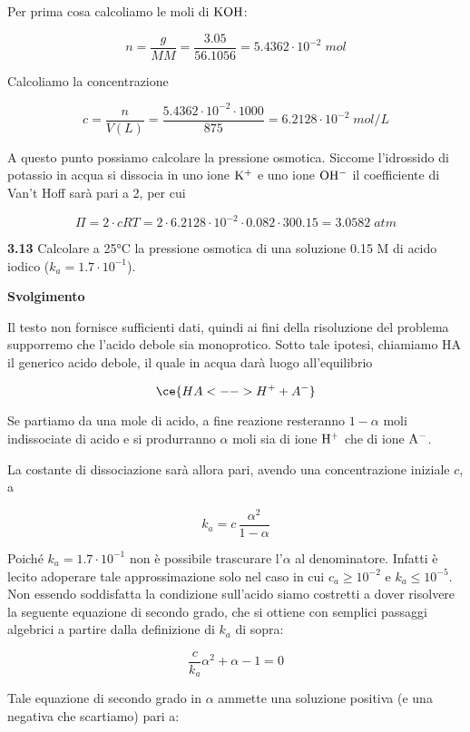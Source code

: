 \vspace{0.2cm}Per prima cosa calcoliamo le moli di $\rm KOH$:

$$n=\frac{g}{MM}=\frac{3.05}{56.1056}=5.4362 \cdot 10^{-2}\;mol$$

Calcoliamo la concentrazione

$$c=\frac{n}{V(L)}=\frac{5.4362 \cdot 10^{-2} \cdot 1000}{875}=6.2128 \cdot 10^{-2}\;mol/L$$

A questo punto possiamo calcolare la pressione osmotica. Siccome l'idrossido di potassio in acqua si dissocia in uno ione $\rm K^{+}$ e uno ione $\rm OH^-$ il coefficiente di Van't Hoff sarà pari a 2, per cui

$$\Pi=2 \cdot cRT
=2 \cdot 6.2128 \cdot 10^{-2} \cdot 0.082 \cdot 300.15
=3.0582\;atm$$

\vspace{0.2cm}\textbf{3.13} Calcolare a 25°C la pressione osmotica di una soluzione 0.15 M di acido iodico ($k_a=1.7 \cdot 10^{-1}$).

\vspace{0.2cm}\large\textbf{Svolgimento}\normalsize

\vspace{0.2cm}Il testo non fornisce sufficienti dati, quindi ai fini della risoluzione del problema supporremo che l'acido debole sia monoprotico. Sotto tale ipotesi, chiamiamo HA il generico acido debole, il quale in acqua darà luogo all'equilibrio

$$\ce{HA <--> H^+ + A^-}$$

Se partiamo da una mole di acido, a fine reazione resteranno $1 - \alpha$ moli indissociate di acido e si produrranno $\alpha$ moli sia di ione $\rm H^+$ che di ione $\rm A^-$. 

La costante di dissociazione sarà allora pari, avendo una concentrazione iniziale $c$, a

$$k_a=c\,\frac{\alpha^2}{1-\alpha}$$

Poiché $k_a=1.7 \cdot 10^{-1}$ non è possibile trascurare l'$\alpha$ al denominatore. Infatti è lecito adoperare tale approssimazione solo nel caso in cui $c_a \geq 10^{-2}$ e $k_a \leq 10^{-5}$. Non essendo soddisfatta la condizione sull'acido siamo costretti a dover risolvere la seguente equazione di secondo grado, che si ottiene con semplici passaggi algebrici a partire dalla definizione di $k_a$ di sopra:

$$\frac{c}{k_a}\alpha^2 + \alpha -1=0$$

Tale equazione di secondo grado in $\alpha$ ammette una soluzione positiva (e una negativa che scartiamo) pari a:

